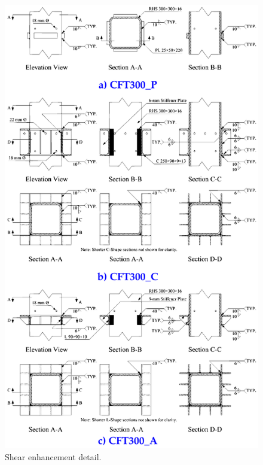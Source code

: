 \begin{figure}\centering
    \includegraphics[width=\columnwidth]{Figures/tikzout/c2020f2.pdf}
    \caption{Shear enhancement detail\citep{chen2020}.}
    \label{c2020f2}
    \end{figure}
